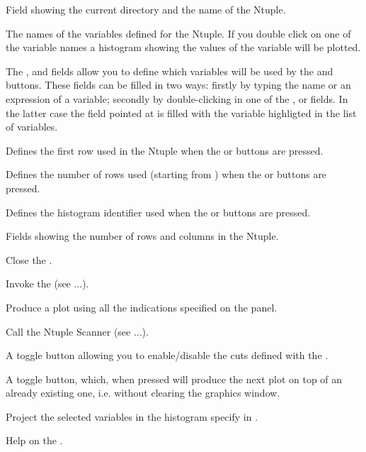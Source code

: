 \begin{EnumZW}
\item Field showing the current directory and the name of the Ntuple.
\item The names of the variables defined for the Ntuple.
      If you double click on one of the variable names
      a histogram showing the values of the variable will be plotted.
\item The ,  and  fields allow
      you to define which variables will be used
      by the  and  buttons.
      These fields can be filled in two ways:
      firstly by typing the name or an expression of a variable;
      secondly by double-clicking in one of the ,  or
       fields. In the latter
      case the field pointed at is filled with the variable highligted in
      the list of variables.
\item Defines the first row used in the Ntuple when the 
      or  buttons are pressed.
\item Defines the number of rows used (starting from ) when the
       or  buttons are pressed.
\item Defines the histogram identifier used when the 
      or  buttons are pressed.
\item Fields showing the number of rows and columns in the Ntuple.
\end{EnumZW}

\begin{EnumZB}
\item Close the \NV.
\item Invoke the \CE{} (see ...).
\item Produce a plot using all the indications specified on the \NV{} panel.
\item Call the Ntuple Scanner (see ...).
\item A toggle button allowing you to enable/disable the cuts defined with the
      \CE{}.
\item A toggle button, which, when pressed will produce the next plot
      on top of an already existing one, i.e. without clearing the graphics
      window.
\item Project the selected variables in the histogram specify in .
\item Help on the \NV.
\end{EnumZB}

\newpage

